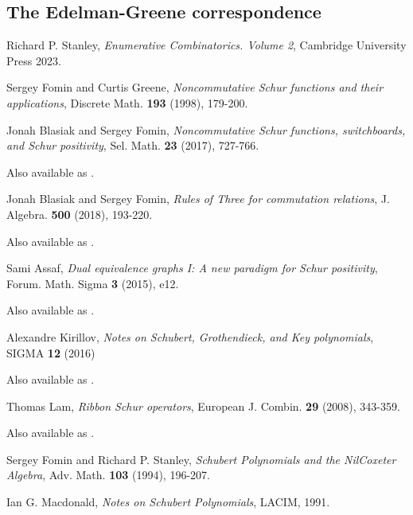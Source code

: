 \documentclass{article}
\begin{document}
\subsection{The Edelman-Greene correspondence}

\begin{thebibliography}{999999}
    \raggedright\footnotesize

    Richard P. Stanley, 
    \textit{Enumerative Combinatorics. Volume 2}, 
    Cambridge University Press 2023.

    Sergey Fomin and Curtis Greene, 
    \textit{Noncommutative Schur functions and their applications}, 
    Discrete Math. \textbf{193} (1998), 179-200.

    Jonah Blasiak and Sergey Fomin, 
    \textit{Noncommutative Schur functions, switchboards, and Schur positivity},
    Sel. Math. \textbf{23} (2017), 727-766.

    Also available as .

    Jonah Blasiak and Sergey Fomin, 
    \textit{Rules of Three for commutation relations},
    J. Algebra. \textbf{500} (2018), 193-220.

    Also available as .

    Sami Assaf,
    \textit{Dual equivalence graphs I: A new paradigm for Schur positivity},
    Forum. Math. Sigma \textbf{3} (2015), e12.

    Also available as .

    Alexandre Kirillov,
    \textit{Notes on Schubert, Grothendieck, and Key polynomials},
    SIGMA \textbf{12} (2016)

    Also available as .

    Thomas Lam,
    \textit{Ribbon Schur operators},
    European J. Combin. \textbf{29} (2008), 343-359.

    Also available as .

    Sergey Fomin and Richard P. Stanley, 
    \textit{Schubert Polynomials and the NilCoxeter Algebra},
    Adv. Math. \textbf{103} (1994), 196-207.

    Ian G. Macdonald, 
    \textit{Notes on Schubert Polynomials}, 
    LACIM, 1991.

\end{thebibliography}
\end{document}
